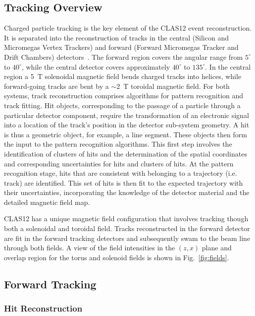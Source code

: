 \subsection{Tracking Overview}
Charged particle tracking is the key element of the CLAS12 event reconstruction. It is separated into the reconstruction of tracks in the central
(Silicon and Micromegas Vertex Trackers)\cite{svt-nim,mm-nim} and forward (Forward Micromegas Tracker and Drift
Chambers) detectors~\cite{dc-nim}. The forward region covers the angular range from $5^\circ$ to $40^\circ$, while
the central detector covers approximately $40^\circ$ to $135^\circ$. In the central region a 5~T
solenoidal magnetic field bends charged tracks into helices, while forward-going tracks are bent by a
$\sim$2~T toroidal magnetic field. For both systems, track reconstruction comprises algorithms for
pattern recognition and track fitting. Hit objects, corresponding to the passage of a particle through a
particular detector component, require the transformation of an electronic signal into a location of the
track's position in the detector sub-system geometry. A hit is thus a geometric object, for example, a
line segment. These objects then form the input to the pattern recognition algorithms. This first step
involves the identification of clusters of hits and the determination of the spatial coordinates and
corresponding uncertainties for hits and clusters of hits. At the pattern recognition stage, hits that are
consistent with belonging to a trajectory (i.e. track) are identified. This set of hits is then fit to the
expected trajectory with their uncertainties, incorporating the knowledge of the detector material and
the detailed magnetic field map.

CLAS12 has a unique magnetic field configuration that involves tracking though both a solenoidal and toroidal field. Tracks reconstructed in the forward detector are fit in the forward tracking detectors and subsequently swam to the beam line through both fields.  A view of the field intensities in the $(z,x)$ plane and overlap region for the torus and solenoid fields is shown in Fig.~\ref{fig:fields}.


\subsection{Forward Tracking}

\subsubsection{Hit Reconstruction}

